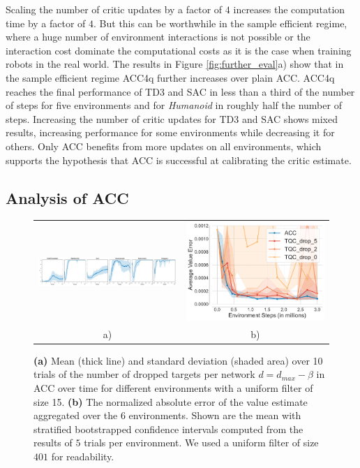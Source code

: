 Scaling the number of critic updates by a factor of $4$ increases the computation time by a factor of $4$. But this can be worthwhile in the sample efficient regime, where a huge number of environment interactions is not possible or the interaction cost dominate the computational costs as it is the case when training robots in the real world.
The results in Figure 
\ref{fig:further_eval}a)
show that in the sample efficient regime ACC4q further increases over plain ACC.
ACC4q reaches the final performance of TD3 and SAC in less than a third of the number of steps for five environments and for \textit{Humanoid} in roughly half the number of steps. 
Increasing the number of critic updates for TD3 and SAC shows mixed results, increasing performance for some environments while decreasing it for others. Only ACC benefits from more updates on all environments, which supports the hypothesis that ACC is successful at calibrating the critic estimate.

\subsection{Analysis of ACC}


\begin{figure}[t]
\footnotesize
\centering 
\begin{tabular}{cc}
    \includegraphics[width=.77\linewidth]{images/analysis/visualize_beta_all_envs.pdf} &
    \hspace{-.4cm}\includegraphics[width=.22\linewidth]{images/analysis/value_error_aggregated_mean_std_0.pdf} \\
    a) & b) \\
\end{tabular}
\vspace{-0.3cm}
\caption{
\textbf{(a)} Mean (thick line) and standard deviation (shaded area) over 10 trials of the number of dropped targets per network $d = d_{max} - \beta$ in ACC over time for different environments with a uniform filter of size 15.
\textbf{(b)} The normalized absolute error of the value estimate aggregated over the $6$ environments. Shown are the mean with stratified bootstrapped confidence intervals computed from the results of $5$ trials per environment. We used a uniform filter of size $401$ for readability.}
\label{fig:analysis}
\vspace{-0.5cm}
\end{figure}

